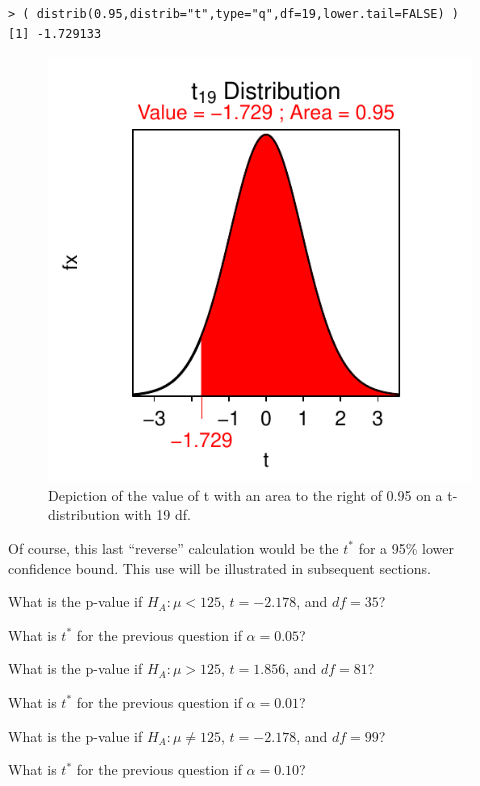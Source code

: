 \documentclass[10pt,openany]{book}\usepackage[]{graphicx}\usepackage[]{color}
\makeatletter
\newenvironment{kframe}{%
 \def\at@end@of@kframe{}%
 \ifinner\ifhmode%
  \def\at@end@of@kframe{\end{minipage}}%
  \begin{minipage}{\columnwidth}%
 \fi\fi%
 \def\FrameCommand##1{\hskip\@totalleftmargin \hskip-\fboxsep
 \colorbox{shadecolor}{##1}\hskip-\fboxsep
     \hskip-\linewidth \hskip-\@totalleftmargin \hskip\columnwidth}%
 \MakeFramed {\advance\hsize-\width
   \@totalleftmargin\z@ \linewidth\hsize
   \@setminipage}}%
 {\par\unskip\endMakeFramed%
 \at@end@of@kframe}
\newenvironment{knitrout}{}{} %
\makeatother
\begin{document}
\begin{knitrout}
\color{fgcolor}\begin{kframe}
\begin{verbatim}
> ( distrib(0.95,distrib="t",type="q",df=19,lower.tail=FALSE) )
[1] -1.729133
\end{verbatim}
\end{kframe}\begin{figure}[hbtp]

{\centering \includegraphics[width=.4\linewidth]{Figs/tstar1-1} 

}

\caption[Depiction of the value of t with an area to the right of 0.95 on a t-distribution with 19 df]{Depiction of the value of t with an area to the right of 0.95 on a t-distribution with 19 df.}\label{fig:tstar1}
\end{figure}


\end{knitrout}

Of course, this last ``reverse'' calculation would be the $t^{*}$ for a 95\% lower confidence bound.  This use will be illustrated in subsequent sections.

\newpage
\begin{exsection}
  \item \label{revex:tTestpv1} \rhw{} What is the p-value if $H_{A}:\mu<125$, $t=-2.178$, and $df=35$? 
  \item \label{revex:tTestci1} \rhw{} What is $t^{*}$ for the previous question if $\alpha=0.05$? 
  \item \label{revex:tTestpv2} \rhw{} What is the p-value if $H_{A}:\mu>125$, $t=1.856$, and $df=81$? 
  \item \label{revex:tTestci2} \rhw{} What is $t^{*}$ for the previous question if $\alpha=0.01$? 
  \item \label{revex:tTestpv3} \rhw{} What is the p-value if $H_{A}:\mu\neq125$, $t=-2.178$, and $df=99$? 
  \item \label{revex:tTestci3} \rhw{} What is $t^{*}$ for the previous question if $\alpha=0.10$? 
\end{exsection}
\end{document}
